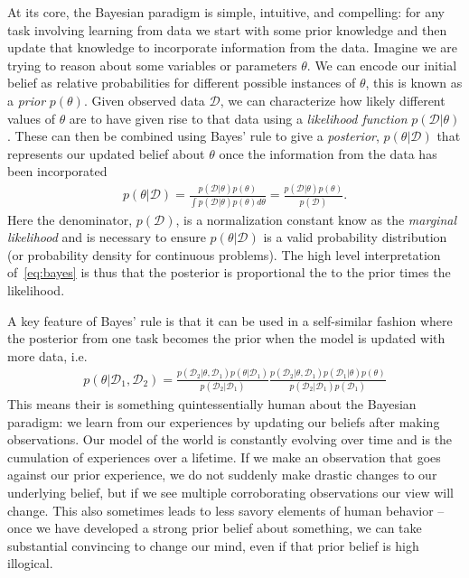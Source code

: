 
At its core, the Bayesian paradigm is simple, intuitive, and compelling: for any task involving
learning from data we start with some prior knowledge and then update that knowledge to
incorporate information from the data.  Imagine we are trying to reason about some variables
or parameters $\theta$.  We can encode our initial belief as relative probabilities for different
possible instances of $\theta$, this is known as a \emph{prior} $p(\theta)$.  Given observed data
$\mathcal{D}$, we can characterize how likely different values of $\theta$ are to have given rise
to that data using a \emph{likelihood function} $p(\mathcal{D}|\theta)$.  These can then be
combined using Bayes' rule to give a \emph{posterior}, $p(\theta | \mathcal{D})$ that 
represents our updated belief about $\theta$ once the information from the data has been
incorporated
\begin{align}
	\label{eq:bayes}
	p(\theta | \mathcal{D}) = \frac{p(\mathcal{D} | \theta)p(\theta)}{\int p(\mathcal{D} | \theta)p(\theta) d\theta} 
	= \frac{p(\mathcal{D} | \theta)p(\theta)}{p(\mathcal{D})}.
\end{align}
Here the denominator, $p(\mathcal{D})$, is a normalization constant know as the \emph{marginal
	likelihood} and is necessary to ensure $p(\theta | \mathcal{D})$ is a valid probability distribution
(or probability density for continuous problems).  The high level interpretation of~\eqref{eq:bayes} is
thus that the posterior is proportional the to the prior times the likelihood.  

A key feature of Bayes' rule is that it can be used in a self-similar fashion where the posterior from
one task becomes the prior when the model is updated with more data, i.e.
\begin{align}
	\label{eq:intro:repeat-bayes}
p(\theta | \mathcal{D}_1, \mathcal{D}_2) = 
\frac{p(\mathcal{D}_2 | \theta, \mathcal{D}_1)p(\theta | \mathcal{D}_1)}{p(\mathcal{D}_2 | \mathcal{D}_1)}
\frac{p(\mathcal{D}_2 | \theta, \mathcal{D}_1)p(\mathcal{D}_1 | \theta) p(\theta)}
{p(\mathcal{D}_2 | \mathcal{D}_1) p(\mathcal{D}_1)} 
\end{align}
This means their is something quintessentially human about the Bayesian paradigm: we learn
from our experiences by updating our beliefs after making observations.  Our model of the world
is constantly evolving over time and is the cumulation of experiences over a lifetime.  
If we make an observation that goes against our prior experience, we do not suddenly make
drastic changes to our underlying belief, but if we see multiple corroborating observations our
view will change.
This also sometimes leads to less savory elements of human behavior -- once we have developed
a strong prior belief about something, we can take substantial convincing to change our mind, even
if that prior belief is high illogical.

